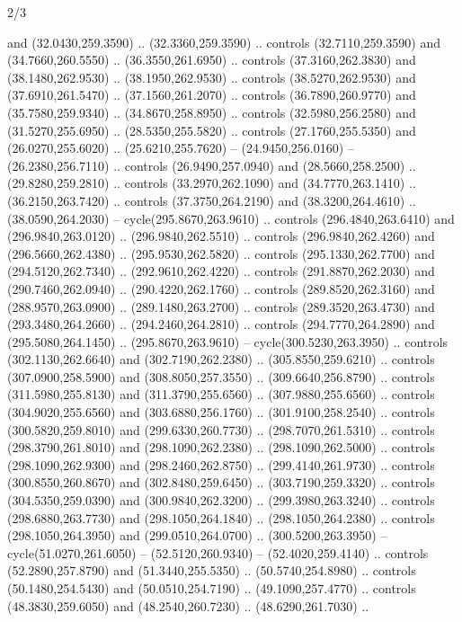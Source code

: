 \begin{flagdescription}{2/3}
\begin{scope}[xshift=0.5\flaglength,yshift=0.5\flagwidth,scale=\stretchfactor]
\begin{scope}[scale=0.001645\flagwidth,yshift=65mm,xshift=-63mm]
\begin{scope}[y=0.80pt, x=0.80pt, yscale=-1,]
\begin{scope}[cm={{1.33333,0.0,0.0,1.33333,(0.0,1e-05)}}]
  and (32.0430,259.3590) .. (32.3360,259.3590) .. controls (32.7110,259.3590)
  and (34.7660,260.5550) .. (36.3550,261.6950) .. controls (37.3160,262.3830)
  and (38.1480,262.9530) .. (38.1950,262.9530) .. controls (38.5270,262.9530)
  and (37.6910,261.5470) .. (37.1560,261.2070) .. controls (36.7890,260.9770)
  and (35.7580,259.9340) .. (34.8670,258.8950) .. controls (32.5980,256.2580)
  and (31.5270,255.6950) .. (28.5350,255.5820) .. controls (27.1760,255.5350)
  and (26.0270,255.6020) .. (25.6210,255.7620) -- (24.9450,256.0160) --
  (26.2380,256.7110) .. controls (26.9490,257.0940) and (28.5660,258.2500) ..
  (29.8280,259.2810) .. controls (33.2970,262.1090) and (34.7770,263.1410) ..
  (36.2150,263.7420) .. controls (37.3750,264.2190) and (38.3200,264.4610) ..
  (38.0590,264.2030) -- cycle(295.8670,263.9610) .. controls (296.4840,263.6410)
  and (296.9840,263.0120) .. (296.9840,262.5510) .. controls (296.9840,262.4260)
  and (296.5660,262.4380) .. (295.9530,262.5820) .. controls (295.1330,262.7700)
  and (294.5120,262.7340) .. (292.9610,262.4220) .. controls (291.8870,262.2030)
  and (290.7460,262.0940) .. (290.4220,262.1760) .. controls (289.8520,262.3160)
  and (288.9570,263.0900) .. (289.1480,263.2700) .. controls (289.3520,263.4730)
  and (293.3480,264.2660) .. (294.2460,264.2810) .. controls (294.7770,264.2890)
  and (295.5080,264.1450) .. (295.8670,263.9610) -- cycle(300.5230,263.3950) ..
  controls (302.1130,262.6640) and (302.7190,262.2380) .. (305.8550,259.6210) ..
  controls (307.0900,258.5900) and (308.8050,257.3550) .. (309.6640,256.8790) ..
  controls (311.5980,255.8130) and (311.3790,255.6560) .. (307.9880,255.6560) ..
  controls (304.9020,255.6560) and (303.6880,256.1760) .. (301.9100,258.2540) ..
  controls (300.5820,259.8010) and (299.6330,260.7730) .. (298.7070,261.5310) ..
  controls (298.3790,261.8010) and (298.1090,262.2380) .. (298.1090,262.5000) ..
  controls (298.1090,262.9300) and (298.2460,262.8750) .. (299.4140,261.9730) ..
  controls (300.8550,260.8670) and (302.8480,259.6450) .. (303.7190,259.3320) ..
  controls (304.5350,259.0390) and (300.9840,262.3200) .. (299.3980,263.3240) ..
  controls (298.6880,263.7730) and (298.1050,264.1840) .. (298.1050,264.2380) ..
  controls (298.1050,264.3950) and (299.0510,264.0700) .. (300.5200,263.3950) --
  cycle(51.0270,261.6050) -- (52.5120,260.9340) -- (52.4020,259.4140) ..
  controls (52.2890,257.8790) and (51.3440,255.5350) .. (50.5740,254.8980) ..
  controls (50.1480,254.5430) and (50.0510,254.7190) .. (49.1090,257.4770) ..
  controls (48.3830,259.6050) and (48.2540,260.7230) .. (48.6290,261.7030) ..

\end{scope}
\end{scope}
\end{scope}
\end{scope}
\end{flagdescription}
